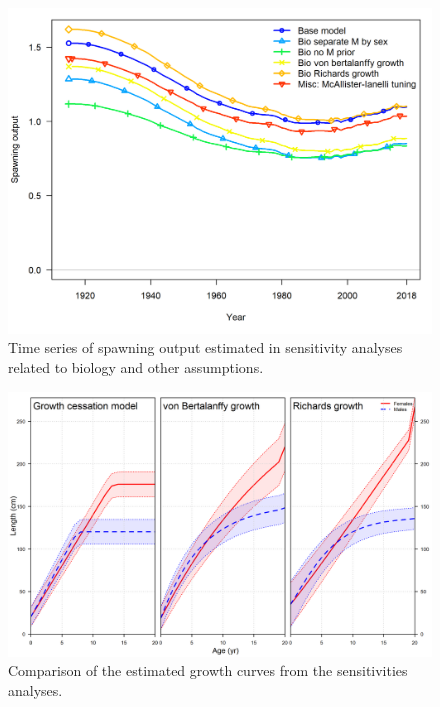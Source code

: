 \documentclass[12pt,]{article}
\begin{document}
\begin{figure}
\centering
\includegraphics{Figures/sens.bio_and_misc_compare1_spawnbio.png}
\caption{Time series of spawning output estimated in sensitivity
analyses related to biology and other assumptions.
\label{fig:Sensitivity_bio_and_misc}}
\end{figure}

\begin{figure}
\centering
\includegraphics{Figures/growth_curve_comparison.png}
\caption{Comparison of the estimated growth curves from the
sensitivities analyses.\label{fig:growth_curve_comparison}}
\end{figure}

\FloatBarrier
\end{document}
